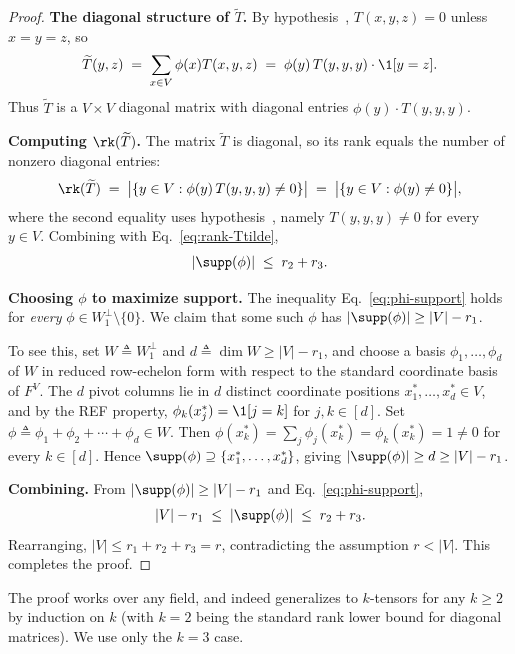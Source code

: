 \begin{proof}
\textbf{The diagonal structure of $\widetilde{T}$.} By hypothesis~, $T(x, y, z) = 0$ unless $x = y = z$, so
\begin{align*}
\widetilde{T}(y, z)
\;=\; \sum_{x \in V} \phi(x) T(x, y, z)
\;=\; \phi(y) \, T(y, y, y) \cdot \1[y = z].
\end{align*}
Thus $\widetilde{T}$ is a $V \times V$ diagonal matrix with diagonal entries $\phi(y) \cdot T(y, y, y)$.

\textbf{Computing $\rk(\widetilde{T})$.} The matrix $\widetilde{T}$ is diagonal, so its rank equals the number of nonzero diagonal entries:
\begin{align*}
\rk(\widetilde{T}) \;=\; \big|\{y \in V : \phi(y) \, T(y, y, y) \ne 0\}\big| \;=\; \big|\{y \in V : \phi(y) \ne 0\}\big|,
\end{align*}
where the second equality uses hypothesis~, namely $T(y, y, y) \ne 0$ for every $y \in V$. Combining with Eq.~\eqref{eq:rank-Ttilde},
\begin{align}\label{eq:phi-support}
|\supp(\phi)| \;\le\; r_2 + r_3.
\end{align}

\textbf{Choosing $\phi$ to maximize support.} The inequality Eq.~\eqref{eq:phi-support} holds for \emph{every} $\phi \in W_1^\perp \setminus \{0\}$. We claim that some such $\phi$ has $|\supp(\phi)| \ge |V| - r_1$.

To see this, set $W \triangleq W_1^\perp$ and $d \triangleq \dim W \ge |V| - r_1$, and choose a basis $\phi_1, \dots, \phi_d$ of $W$ in reduced row-echelon form with respect to the standard coordinate basis of $F^V$. The $d$ pivot columns lie in $d$ distinct coordinate positions $x_1^*, \dots, x_d^* \in V$, and by the REF property, $\phi_k(x_j^*) = \1[j = k]$ for $j, k \in [d]$. Set $\phi \triangleq \phi_1 + \phi_2 + \cdots + \phi_d \in W$. Then $\phi(x_k^*) = \sum_j \phi_j(x_k^*) = \phi_k(x_k^*) = 1 \ne 0$ for every $k \in [d]$. Hence $\supp(\phi) \supseteq \{x_1^*, \dots, x_d^*\}$, giving $|\supp(\phi)| \ge d \ge |V| - r_1$.

\textbf{Combining.} From $|\supp(\phi)| \ge |V| - r_1$ and Eq.~\eqref{eq:phi-support},
\begin{align*}
|V| - r_1 \;\le\; |\supp(\phi)| \;\le\; r_2 + r_3.
\end{align*}
Rearranging, $|V| \le r_1 + r_2 + r_3 = r$, contradicting the assumption $r < |V|$. This completes the proof.
\end{proof}

\begin{remark}\label{rem:slice-rank-diagonal-q}
The proof works over any field, and indeed generalizes to $k$-tensors for any $k \ge 2$ by induction on $k$ (with $k = 2$ being the standard rank lower bound for diagonal matrices). We use only the $k = 3$ case.
\end{remark}

